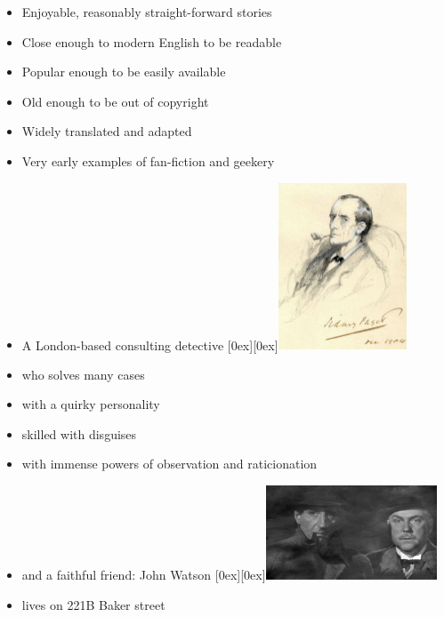 \documentclass[a4paper,landscape,headrule,footrule,xetex,25pt]{foils}
\begin{document}
\begin{itemize}
\item Enjoyable, reasonably straight-forward stories
\item Close enough to modern English to be readable
\item Popular enough to be easily available
\item Old enough to be out of copyright
\item Widely translated and adapted
\item Very early examples of fan-fiction and geekery
\end{itemize}

\begin{itemize}
\item A London-based consulting detective
  \raisebox{-20ex}[0ex][0ex]{\includegraphics[width=0.3\textwidth]{pics/Sherlock_Holmes_Portrait_Paget}}
\item who solves many cases
\item with a quirky personality
\item skilled with disguises
\item with immense powers of observation and raticionation
\item and a faithful friend: John Watson
  \raisebox{-10ex}[0ex][0ex]{\includegraphics[width=0.4\textwidth]{pics/sherlock-holmes-john-watson}}
\item lives on 221B Baker street
%
\end{itemize}
\end{document}
